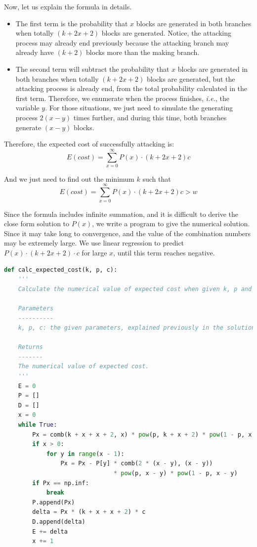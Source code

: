 \documentclass{oxmathproblems}
\makeatletter
\theoremstyle{definition}
\renewenvironment{solution}[1][Solution] {\par\pushQED{\qed}\normalfont\topsep6\p@\@plus6\p@\relax\trivlist\item[\hskip\labelsep\bfseries#1\@addpunct{.}]\ignorespaces}{\popQED\endtrivlist\@endpefalse} \makeatother
\makeatother
\begin{document}
\begin{solution}
	Now, let us explain the formula in details.
	\begin{itemize}
		\item The first term is the probability that $x$ blocks are generated in both branches when totally $(k+2x+2)$ blocks are generated. Notice, the attacking process may already end previously because the attacking branch may already have $(k + 2)$ blocks more than the making branch.
		\item The second term will subtract the probability that $x$ blocks are generated in both branches when totally $(k+2x+2)$ blocks are generated, but the attacking process is already end, from the total probability calculated in the first term. Therefore, we enumerate when the process finishes, \textit{i.e.}, the variable $y$. For those situations, we just need to simulate the generating process $2(x-y)$ times further, and during this time, both branches generate $(x - y)$ blocks. 
	\end{itemize}

	Therefore, the expected cost of successfully attacking is:
	$$
	E(cost) = \sum_{x=0}^\infty P(x) \cdot (k+2x+2)c
	$$

	And we just need to find out the minimum $k$ such that
	$$
	E(cost) = \sum_{x=0}^\infty P(x) \cdot (k+2x+2)c > w
	$$

	Since the formula includes infinite summation, and it is difficult to derive the close form solution to $P(x)$, we write a program to give the numerical solution. Since it may take long to convergence, and the value of the combination numbers may be extremely large. We use linear regression to predict $P(x) \cdot (k + 2x + 2) \cdot c$ for large $x$, until this term reaches negative.
\begin{lstlisting}[language=python]
def calc_expected_cost(k, p, c):
    '''
    Calculate the numerical value of expected cost when given k, p and c.

    Parameters
    ----------
    k, p, c: the given parameters, explained previously in the solution.
    
    Returns
    -------
    The numerical value of expected cost.
    '''
    E = 0
    P = []
    D = []
    x = 0
    while True:
        Px = comb(k + x + x + 2, x) * pow(p, k + x + 2) * pow(1 - p, x)
        if x > 0:
            for y in range(x - 1):
                Px = Px - P[y] * comb(2 * (x - y), (x - y)) 
                               * pow(p, x - y) * pow(1 - p, x - y)
        if Px == np.inf:
            break
        P.append(Px)
        delta = Px * (k + x + x + 2) * c
        D.append(delta)
        E += delta
        x += 1
    

\end{lstlisting}
\end{solution}
\end{document}
